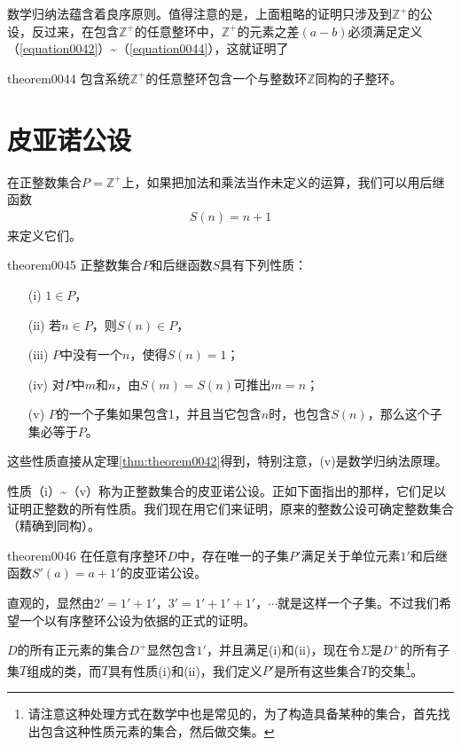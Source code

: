 数学归纳法蕴含着良序原则。值得注意的是，上面粗略的证明只涉及到$\mathbb{Z}^+$的公设，反过来，在包含$\mathbb{Z}^+$的任意整环中，$\mathbb{Z}^+$的元素之差$(a-b)$必须满足定义（\ref{equation0042}）\textasciitilde（\ref{equation0044}），这就证明了
\begin{theorem}{}{theorem0044}
包含系统$\mathbb{Z}^+$的任意整环包含一个与整数环$\mathbb{Z}$同构的子整环。
\end{theorem}


\section{皮亚诺公设}\label{subsection0010206}
在正整数集合$P=\mathbb{Z}^+$上，如果把加法和乘法当作未定义的运算，我们可以用后继函数
\begin{gather}\label{equation0045}
S(n)=n+1
\end{gather}
来定义它们。

\begin{theorem}{}{theorem0045}
正整数集合$P$和后继函数$S$具有下列性质：
\begin{enumerate}
\item[(i)] $1 \in P$，
\item[(ii)] 若$n \in P$，则$S(n) \in P$，
\item[(iii)] $P$中没有一个$n$，使得$S(n)=1$；
\item[(iv)] 对$P$中$m$和$n$，由$S(m)=S(n)$可推出$m=n$；
\item[(v)] $P$的一个子集如果包含1，并且当它包含$n$时，也包含$S(n)$，那么这个子集必等于$P$。
\end{enumerate}
\end{theorem}

这些性质直接从定理\ref{thm:theorem0042}得到，特别注意，(v)是数学归纳法原理。

性质（i）\textasciitilde（v）称为正整数集合的皮亚诺公设。正如下面指出的那样，它们足以证明正整数的所有性质。我们现在用它们来证明，原来的整数公设可确定整数集合（精确到同构）。

\begin{theorem}{}{theorem0046}
在任意有序整环$D$中，存在唯一的子集$P'$满足关于单位元素$1'$和后继函数$S'(a)=a+1'$的皮亚诺公设。
\end{theorem}

直观的，显然由$2'=1'+1'$，$3'=1'+1'+1'$，$\cdots$就是这样一个子集。不过我们希望一个以有序整环公设为依据的正式的证明。

$D$的所有正元素的集合$D^+$显然包含$1'$，并且满足(i)和(ii)，现在令$\Sigma$是$D^+$的所有子集$T$组成的类，而$T$具有性质(i)和(ii)，我们定义$P'$是所有这些集合$T$的交集\footnote{请注意这种处理方式在数学中也是常见的，为了构造具备某种的集合，首先找出包含这种性质元素的集合，然后做交集。}。

